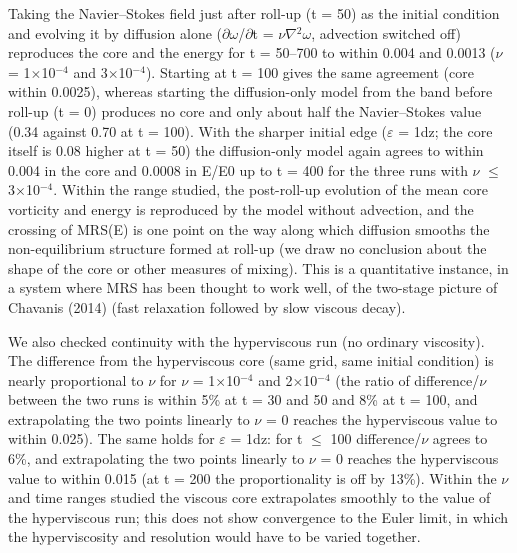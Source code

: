\documentclass[11pt]{article}
\begin{document}
Taking the Navier--Stokes field just after roll-up (t = 50) as the initial condition and evolving it by diffusion alone ($\partial{}\omega{}$/$\partial{}$t = $\nu{}\nabla{}^{2}\omega{}$, advection switched off) reproduces the core and the energy for t = 50--700 to within 0.004 and 0.0013 ($\nu{}$ = 1$\times{}$10$^{-4}$ and 3$\times{}$10$^{-4}$). Starting at t = 100 gives the same agreement (core within 0.0025), whereas starting the diffusion-only model from the band before roll-up (t = 0) produces no core and only about half the Navier--Stokes value (0.34 against 0.70 at t = 100). With the sharper initial edge ($\varepsilon{}$ = 1dz; the core itself is 0.08 higher at t = 50) the diffusion-only model again agrees to within 0.004 in the core and 0.0008 in E/E0 up to t = 400 for the three runs with $\nu{}$ $\le{}$ 3$\times{}$10$^{-4}$. Within the range studied, the post-roll-up evolution of the mean core vorticity and energy is reproduced by the model without advection, and the crossing of MRS(E) is one point on the way along which diffusion smooths the non-equilibrium structure formed at roll-up (we draw no conclusion about the shape of the core or other measures of mixing). This is a quantitative instance, in a system where MRS has been thought to work well, of the two-stage picture of Chavanis (2014) (fast relaxation followed by slow viscous decay).

We also checked continuity with the hyperviscous run (no ordinary viscosity). The difference from the hyperviscous core (same grid, same initial condition) is nearly proportional to $\nu{}$ for $\nu{}$ = 1$\times{}$10$^{-4}$ and 2$\times{}$10$^{-4}$ (the ratio of difference/$\nu{}$ between the two runs is within 5\% at t = 30 and 50 and 8\% at t = 100, and extrapolating the two points linearly to $\nu{}$ = 0 reaches the hyperviscous value to within 0.025). The same holds for $\varepsilon{}$ = 1dz: for t $\le{}$ 100 difference/$\nu{}$ agrees to 6\%, and extrapolating the two points linearly to $\nu{}$ = 0 reaches the hyperviscous value to within 0.015 (at t = 200 the proportionality is off by 13\%). Within the $\nu{}$ and time ranges studied the viscous core extrapolates smoothly to the value of the hyperviscous run; this does not show convergence to the Euler limit, in which the hyperviscosity and resolution would have to be varied together.
\end{document}
